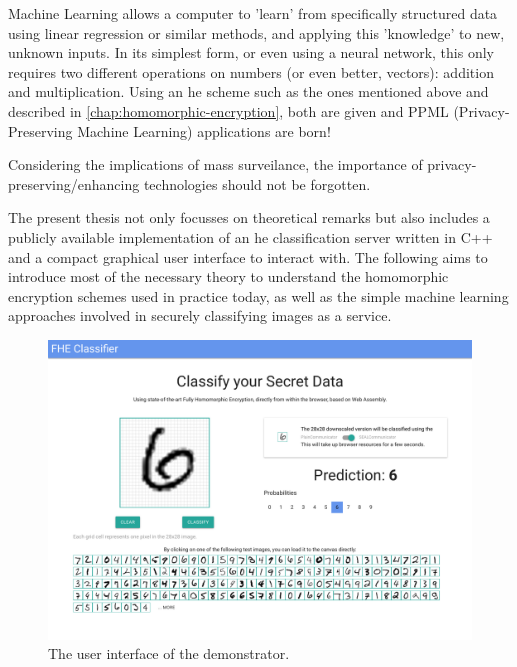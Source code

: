 Machine Learning allows a computer to 'learn' from specifically structured data using linear regression or similar methods, and applying this 'knowledge' to new, unknown inputs.
In its simplest form, or even using a neural network, this only requires two different operations on numbers (or even better, vectors): addition and multiplication.
Using an \gls{he} scheme such as the ones mentioned above and described in \autoref{chap:homomorphic-encryption}, both are given and PPML (Privacy-Preserving Machine Learning) applications are born!

Considering the implications of mass surveilance, the importance of privacy-preserving/enhancing technologies should not be forgotten.

The present thesis not only focusses on theoretical remarks but also includes a publicly available implementation of an \gls{he} classification server written in C++ and a compact graphical user interface to interact with.
The following aims to introduce most of the necessary theory to understand the homomorphic encryption schemes used in practice today, as well as the simple machine learning approaches involved in securely classifying images as a service.

\begin{figure}[H]
  \centering
  \includegraphics[width=\linewidth]{figures/frontend.pdf}
  \vspace{-1.2cm}
  \caption{The user interface of the demonstrator.}
\end{figure}
